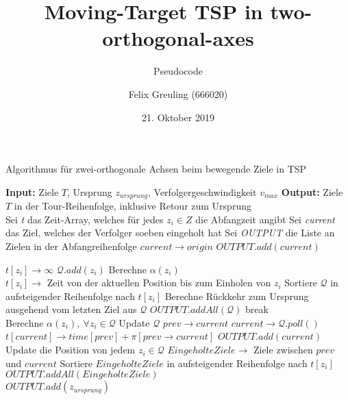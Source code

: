 \documentclass{scrartcl}
\title{Moving-Target TSP in two-orthogonal-axes}
\subtitle{Pseudocode}
\author{Felix Greuling (666020)}
\date{21. Oktober 2019}
\begin{document}
\maketitle

\begin{minipage}{1\linewidth}
\begin{algorithm}[H]
\begin{algorithmic}
\caption{Algorithmus für zwei-orthogonale Achsen beim bewegende Ziele in TSP}
\label{alg:2OA.1}
\State \textbf{Input:} Ziele $T$, Ursprung $z_{ursprung}$, Verfolgergeschwindigkeit $v_{max}$
\State \textbf{Output:} Ziele $T$ in der Tour-Reihenfolge, inklusive Retour zum Ursprung\\

\State Sei \emph{t} das Zeit-Array, welches für jedes $z_i\in Z$ die Abfangzeit angibt
\State Sei \emph{current} das Ziel, welches der Verfolger soeben eingeholt hat
\State Sei \emph{OUTPUT} die Liste an Zielen in der Abfangreihenfolge
\State $current\rightarrow origin$
\State $OUTPUT.add(current)$
\State 

\State $t[z_i] \rightarrow \infty$
\State $\mathcal{Q}.add(z_i)$
\State Berechne $\alpha(z_i)$
\EndFor\\

\State $t[z_i] \rightarrow$ Zeit von der aktuellen Position bis zum Einholen von $z_i$
\EndFor
\State Sortiere $\mathcal{Q}$ in aufsteigender Reihenfolge nach $t[z_i]$
\State Berechne Rückkehr zum Ursprung ausgehend vom letzten Ziel aus $\mathcal{Q}$
\State $OUTPUT.addAll(\mathcal{Q})$
\State break
\EndIf \\

\State Berechne $\alpha(z_i),~\forall z_i\in\mathcal{Q}$
\State Update $\mathcal{Q}$
\State $prev\rightarrow current$
\State $current \rightarrow \mathcal{Q}.poll()$
\State $t[current] \rightarrow time[prev] + \pi[prev\rightarrow current]$
\State $OUTPUT.add(current)$
\State Update die Position von jedem $z_i\in\mathcal{Q}$
\State $EingeholteZiele \rightarrow$ Ziele zwischen $prev$ und $current$
\State Sortiere $EingeholteZiele$ in aufsteigender Reihenfolge nach $t[z_i]$
\State $OUTPUT.addAll(EingeholteZiele)$
\EndWhile\\

\State $OUTPUT.add(z_{ursprung})$

\end{algorithmic}
\end{algorithm}
\end{minipage}
\end{document}
